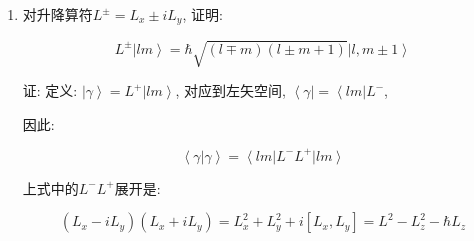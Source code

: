 \begin{enumerate}
(3)考虑到:

$ \overline {( L_x - \overline {L_x} )^2} = \overline {L_x^2 +
(\overline {L_x})^2 - 2 L_x \overline {L_x}} = \overline{L_x^2} -
(\overline {L_x})^2 $

定义角动量的不确定:

\begin{equation*}
\Delta L_x = \sqrt {\overline{L_x^2} - (\overline {L_x})^2} = \hbar
\sqrt{\frac{l(l+1)-m^2}{2}}
\end{equation*}

类似地: $\Delta L_y = \hbar \sqrt{\frac{l(l+1)-m^2}{2}} $,

所以:

\begin{equation*}
\Delta L_x \Delta L_y = \frac{\hbar^2}{2} (l(l+1)-m^2)
\end{equation*}

由于$L_x, L_y$不对易, $[L_x, L_y]=i\hbar L_z$,
应满足如下不确定关系(uncertainty relation),

\begin{equation*}
\Delta L_x \Delta L_y \geq \frac{1}{2} \left| \overline{[L_x, L_y] }
\right| = \frac{m\hbar^2}{2}
\end{equation*}

当$m=\pm l$时, 左侧(L.H.S, Left hand side)存在最小值:
$\frac{l\hbar^2}{2}$, 由于$m= 0,\pm 1, \pm 2, ..., \pm l$,
左侧(L.H.S.) $\geq$ 右侧(R.H.S) 成立.

\item 对升降算符$L^{\pm} = L_x \pm i L_y$, 证明:

\begin{equation*}
L^{\pm} \left| lm \right\rangle = \hbar \sqrt{(l \mp m)(l \pm m +1)
} \left|l, m \pm 1 \right\rangle
\end{equation*}

证: 定义: $\left| \gamma \right\rangle = L^+ \left| lm
\right\rangle$, 对应到左矢空间, $\left\langle \gamma \right| =
\left\langle lm  \right| L^-$,

因此:

\begin{equation*}
\left\langle \gamma | \gamma \right\rangle = \left\langle lm \right|
L^- L^+ \left| lm \right\rangle
\end{equation*}

上式中的$L^- L^+$展开是:

\begin{equation*}
(L_x-iL_y) (L_x + i L_y) = L_x^2 + L_y^2 +i [L_x, L_y] = L^2 - L_z^2
- \hbar L_z
\end{equation*}


\end{enumerate}
